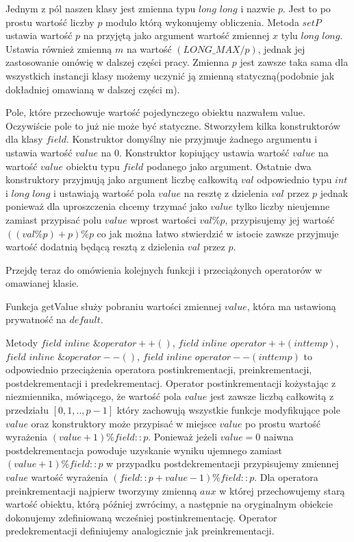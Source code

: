 \documentclass{article}
\begin{document}
Jednym z pól naszen klasy jest zmienna typu $long$ $long$ i nazwie $p$. Jest to po prostu wartość liczby $p$ 
modulo którą wykonujemy obliczenia. Metoda $setP$ ustawia wartość
$p$ na przyjętą jako argument wartość zmiennej $x$ tylu 
$long$ $long$. Ustawia również zmienną $m$ na wartość $(LONG\_MAX / p)$, jednak jej
zastosowanie omówię w dalszej części pracy. Zmienna $p$ jest zawsze taka 
sama dla wszystkich instancji klasy możemy uczynić ją zmienną statyczną(podobnie jak dokładniej 
omawianą w dalszej części m).

Pole, które przechowuje wartość pojedynczego obiektu nazwałem value. Oczywiście
pole to już nie może być statyczne.
Stworzyłem kilka konstruktorów dla klasy $field$. Konstruktor domyślny
nie przyjmuje żadnego argumentu i ustawia wartość $value$ na $0$. 
Konstruktor kopiujący ustawia wartość $value$ na wartość $value$ obiektu 
typu $field$ podanego jako argument. Ostatnie dwa konstruktory
przyjmują jako argument liczbę całkowitą $val$ odpowiednio typu
$int$ i $long$ $long$ i ustawiają wartość pola $value$ na resztę z
dzielenia $val$ przez $p$ jednak ponieważ dla uproszczenia chcemy trzymać
jako $value$ tylko liczby nieujemne zamiast przypisać polu $value$ wprost
wartości $val \% p$, przypisujemy jej wartość $((val\%p)+p)\%p$ co jak 
można łatwo stwierdzić w istocie zawsze przyjmuje wartość dodatnią będącą
resztą z dzielenia $val$ przez $p$.

Przejdę teraz do omówienia kolejnych funkcji i przeciążonych operatorów
w omawianej klasie.

Funkcja  getValue służy pobraniu wartości zmiennej $value$, która ma 
ustawioną prywatność na $default$.

Metody $field$ $inline$ $\&operator++()$, 
$field$ $inline$ $operator++(int temp)$,
$field$ $inline$ $\&operator--()$,
$field$ $inline$ $operator--(int temp)$ to odpowiednio przeciążenia
operatora postinkrementacji, preinkrementacji, postdekrementacji i predekrementacj.
Operator postinkrementacji kożystając z niezmiennika, mówiącego,
że wartość pola $value$ jest zawsze liczbą całkowitą z
przedziału $[0,1,..,p-1]$ który
zachowują wszystkie funkcje modyfikujące pole $value$ oraz konstruktory
może przypisać w miejsce $value$ po prostu wartość wyrażenia
$(value+1)\%field::p$. Ponieważ jeżeli $value=0$ naiwna postdekrementacja
powoduje uzyskanie wyniku ujemnego zamiast $(value+1)\%field::p$ w przypadku
postdekrementacji przypisujemy zmiennej $value$ wartość
wyrażenia $(field::p+value-1)\%field::p$. Dla operatora 
preinkrementacji najpierw tworzymy zmienną $aux$ w której przechowujemy
starą wartość obiektu, którą później zwrócimy, a następnie na oryginalnym 
obiekcie dokonujemy zdefiniowaną wcześniej postinkrementację.
Operator predekrementacji definiujemy analogicznie jak preinkrementacji.
\end{document}
